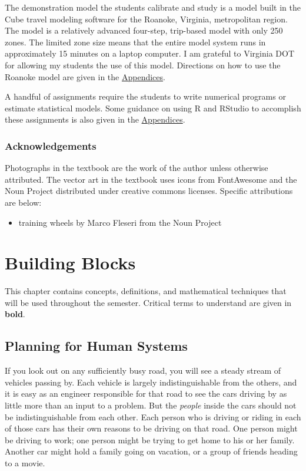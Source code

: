 \documentclass[]{book}
\providecommand{\tightlist}{%
  \setlength{\itemsep}{0pt}\setlength{\parskip}{0pt}}
\begin{document}
The demonstration model the students calibrate and study is a model built in the
Cube travel modeling software for the Roanoke, Virginia, metropolitan region.
The model is a relatively advanced four-step, trip-based model with only 250
zones. The limited zone size means that the entire model system runs in
approximately 15 minutes on a laptop computer. I am grateful to Virginia DOT for
allowing my students the use of this model. Directions on how to use the Roanoke
model are given in the \protect\hyperlink{app-demomodel}{Appendices}.

A handful of assignments require the students to write numerical programs or
estimate statistical models. Some guidance on using R and RStudio to accomplish
these assignments is also given in the \protect\hyperlink{app-rstudio}{Appendices}.

\hypertarget{acknowledgements}{%
\subsection*{Acknowledgements}\label{acknowledgements}}

Photographs in the textbook are the work of the author unless otherwise attributed.
The vector art in the textbook uses icons from FontAwesome and the Noun Project
distributed under creative commons licenses. Specific attributions are below:

\begin{itemize}
\tightlist
\item
  training wheels by Marco Fleseri from the Noun Project
\end{itemize}

\hypertarget{chap-blocks}{%
\chapter{Building Blocks}\label{chap-blocks}}

This chapter contains concepts, definitions, and mathematical techniques that will
be used throughout the semester. Critical terms to understand are given in \textbf{bold}.

\hypertarget{planning-for-human-systems}{%
\section{Planning for Human Systems}\label{planning-for-human-systems}}

If you look out on any sufficiently busy road, you will see a steady stream of
vehicles passing by. Each vehicle is largely indistinguishable from the others,
and it is easy as an engineer responsible for that road to see the cars driving
by as little more than an input to a problem. But the \emph{people} inside the cars
should not be indistinguishable from each other. Each person who is driving or
riding in each of those cars has their own reasons to be driving on that road.
One person might be driving to work; one person might be trying to get home to
his or her family. Another car might hold a family going on vacation, or a group
of friends heading to a movie.
\end{document}
